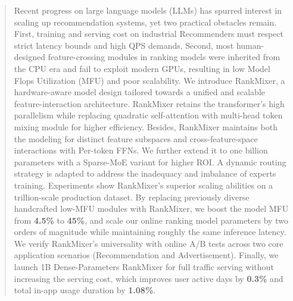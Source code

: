 \documentclass[sigconf]{acmart}
\begin{document}




\renewcommand{\shortauthors}{Zhifang Fan et al.}

\begin{abstract}
  Recent progress on large language models (LLMs) has spurred interest in scaling up recommendation systems, yet two practical obstacles remain. First, training and serving cost on industrial Recommenders must respect strict latency bounds and high QPS demands. Second, most human-designed feature-crossing modules in ranking models were inherited from the CPU era and fail to exploit modern GPUs, resulting in low Model Flops Utilization (MFU) and poor scalability. We introduce RankMixer, a hardware-aware model design tailored towards a unified and scalable feature-interaction architecture. RankMixer retains the transformer’s high parallelism while replacing quadratic self-attention with multi-head token mixing module for higher efficiency. Besides, RankMixer maintains both the modeling for distinct feature subspaces and cross-feature-space interactions with Per-token FFNs. We further extend it to one billion parameters with a Sparse-MoE variant for higher ROI. A dynamic routing strategy is adapted to address the inadequacy and imbalance of experts training. Experiments show RankMixer's superior scaling abilities on a trillion-scale production dataset. By replacing previously diverse handcrafted low-MFU modules with RankMixer, we boost the model MFU from \textbf{4.5\%} to \textbf{45\%}, and scale our online ranking model parameters by two orders of magnitude while maintaining roughly the same inference latency. We verify RankMixer's universality with online A/B tests across two core application scenarios (Recommendation and Advertisement). Finally, we launch 1B Dense-Parameters RankMixer for full traffic serving without increasing the serving cost, which improves user active days by \textbf{0.3\%} and total in-app usage duration by \textbf{1.08\%}.

\end{abstract}
\end{document}
